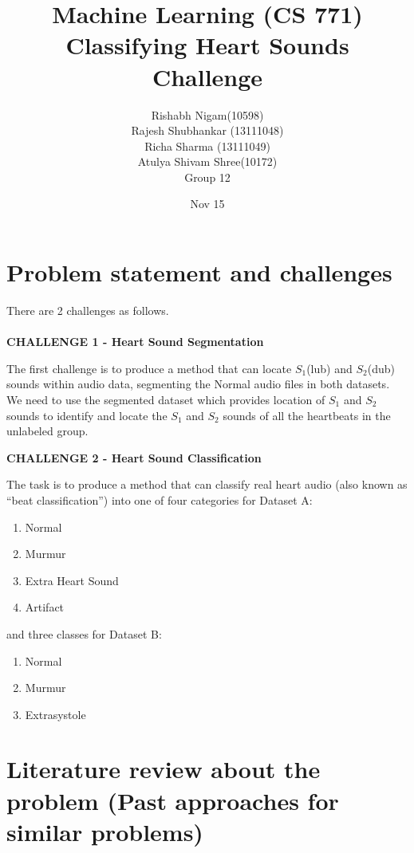\documentclass{article}
\title{Machine Learning (CS 771) \\ Classifying Heart Sounds Challenge}
\author{Rishabh Nigam(10598) \\ Rajesh Shubhankar (13111048) \\ Richa Sharma (13111049) \\ Atulya Shivam Shree(10172) \\ Group 12}
\date{Nov 15}
\begin{document}
\maketitle

\section{Problem statement and challenges}
There are 2 challenges as follows. \\ \\
\textbf{CHALLENGE 1 - Heart Sound Segmentation} 

The first challenge is to produce a method that can locate $S_1$(lub) and $S_2$(dub) sounds within audio data, segmenting the Normal audio files in both datasets. We need to use the segmented dataset which provides location of $S_1$ and $S_2$ sounds to identify and locate the $S_1$ and $S_2$ sounds of all the heartbeats in the unlabeled group.

\textbf{CHALLENGE 2 - Heart Sound Classification}

The task is to produce a method that can classify real heart audio (also known as “beat classification”) into one of four categories for Dataset A: 
\begin{enumerate}
\item Normal
\item Murmur
\item Extra Heart Sound
\item Artifact
\end{enumerate}
and three classes for Dataset B:
\begin{enumerate}
\item Normal
\item Murmur
\item Extrasystole
\end{enumerate}

\section{Literature review about the problem (Past approaches for similar problems)}
\end{document}
